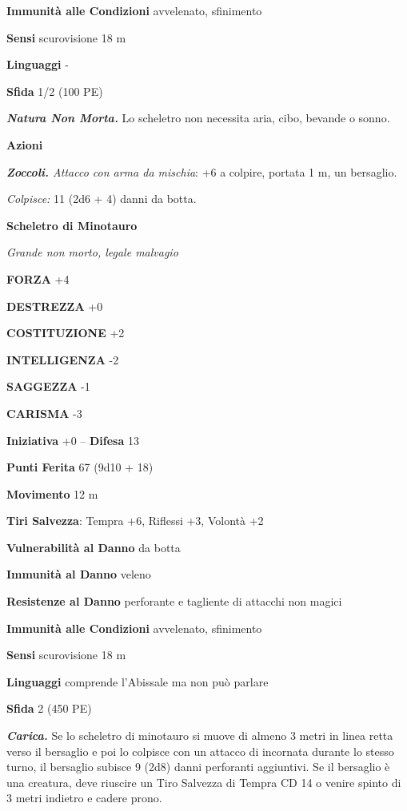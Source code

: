 \begin{multicols}{2}
\textbf{Immunità alle Condizioni} avvelenato, sfinimento

\textbf{Sensi} scurovisione 18 m 

\textbf{Linguaggi} -

\textbf{Sfida} 1/2 (100 PE)

\emph{\textbf{Natura Non Morta.}} Lo scheletro non necessita aria, cibo, bevande o sonno.

\textbf{Azioni}

\emph{\textbf{Zoccoli.} Attacco con arma da mischia}: +6 a colpire, portata 1 m, un bersaglio.

\emph{Colpisce:} 11 (2d6 + 4) danni da botta.

\medskip{}\textbf{Scheletro di Minotauro}

\emph{Grande non morto, legale malvagio}

\textbf{FORZA} +4

\textbf{DESTREZZA} +0

\textbf{COSTITUZIONE} +2

\textbf{INTELLIGENZA} -2

\textbf{SAGGEZZA} -1

\textbf{CARISMA} -3

\textbf{Iniziativa} +0 -- \textbf{Difesa} 13

\textbf{Punti Ferita} 67 (9d10 + 18)

\textbf{Movimento} 12 m

\textbf{Tiri Salvezza}: Tempra +6, Riflessi +3, Volontà +2

\textbf{Vulnerabilità al Danno} da botta

\textbf{Immunità al Danno} veleno

\textbf{Resistenze al Danno} perforante e tagliente di attacchi non magici

\textbf{Immunità alle Condizioni} avvelenato, sfinimento

\textbf{Sensi} scurovisione 18 m

\textbf{Linguaggi} comprende l'Abissale ma non può parlare

\textbf{Sfida} 2 (450 PE)

\emph{\textbf{Carica.}} Se lo scheletro di minotauro si muove di almeno 3 metri in linea retta verso il bersaglio e poi lo colpisce con un attacco di incornata durante lo stesso turno, il bersaglio subisce 9 (2d8) danni perforanti aggiuntivi. Se il bersaglio è una creatura, deve riuscire un Tiro Salvezza di Tempra CD 14 o venire spinto di 3 metri indietro e cadere prono.


\end{multicols}
